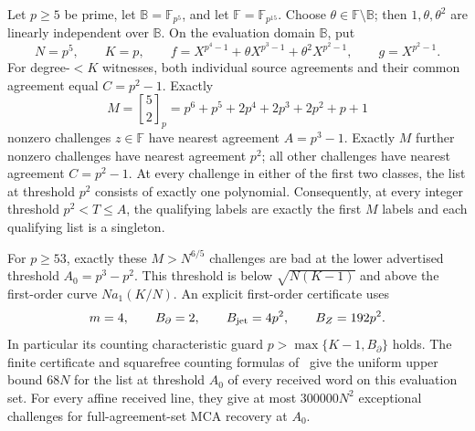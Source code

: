 \begin{proposition}
\label{prop:low-rate-large-characteristic-singletons}
Let $p\ge5$ be prime, let $\mathbb B=\mathbb F_{p^5}$, and let
$\mathbb F=\mathbb F_{p^{15}}$. Choose $\theta\in\mathbb F\setminus\mathbb B$; then
$1,\theta,\theta^2$ are linearly independent over $\mathbb B$.
On the evaluation domain $\mathbb B$, put
\[
 N=p^5,\qquad K=p,\qquad
 f=X^{p^4-1}+\theta X^{p^3-1}+\theta^2X^{p^2-1},
 \qquad g=X^{p^2-1}.
\]
For degree-$<K$ witnesses, both individual source agreements and their
common agreement equal $C=p^2-1$.
Exactly
\[
 M=\genfrac{[}{]}{0pt}{}{5}{2}_p
  =p^6+p^5+2p^4+2p^3+2p^2+p+1
\]
nonzero challenges $z\in\mathbb F$ have nearest agreement $A=p^3-1$.
Exactly $M$ further nonzero challenges have nearest agreement $p^2$;
all other challenges have nearest agreement $C=p^2-1$.
At every challenge in either of the first two classes, the list at
threshold $p^2$ consists of exactly one polynomial.
Consequently, at every integer threshold $p^2<T\le A$, the qualifying
labels are exactly the first $M$ labels and each qualifying list is a singleton.

For $p\ge53$, exactly these $M>N^{6/5}$ challenges are bad at the lower advertised threshold
$A_0=p^3-p^2$. This threshold is below $\sqrt{N(K-1)}$ and above the
first-order curve $Na_1(K/N)$. An explicit first-order certificate uses
\[
 m=4,\qquad B_\partial=2,\qquad B_{\rm jet}=4p^2,
 \qquad B_Z=192p^2.
\]
In particular its counting characteristic guard
$p>\max\{K-1,B_\partial\}$ holds. The finite certificate and squarefree counting formulas
of~\cite[Proposition~5.10 and Lemma~5.6]{dkt2026} give the uniform
upper bound $68N$ for the list at threshold $A_0$ of every received word
on this evaluation set. For every affine received line, they give at most
$300000N^2$ exceptional challenges for full-agreement-set MCA recovery
at $A_0$.
\end{proposition}

